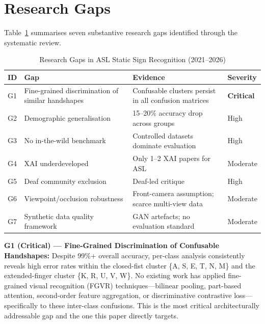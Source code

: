\documentclass[conference]{IEEEtran}
\begin{document}
\section{Research Gaps}
\label{sec:gaps}

Table~\ref{tab:gaps} summarises seven substantive research gaps identified
through the systematic review.

\begin{table}[htbp]
\caption{Research Gaps in ASL Static Sign Recognition (2021--2026)}
\label{tab:gaps}
\centering
\renewcommand{\arraystretch}{1.15}
\begin{tabular}{p{0.28cm} p{3.4cm} p{1.9cm} p{1.0cm}}
\toprule
\textbf{ID} & \textbf{Gap} & \textbf{Evidence} & \textbf{Severity} \\
\midrule
G1 & Fine-grained discrimination of similar handshapes
   & Confusable clusters persist in all confusion matrices & \textbf{Critical} \\
G2 & Demographic generalisation
   & 15--20\% accuracy drop across groups~\cite{alam2024} & High \\
G3 & No in-the-wild benchmark
   & Controlled datasets dominate evaluation & High \\
G4 & XAI underdeveloped
   & Only 1--2 XAI papers for ASL~\cite{naz2025} & Moderate \\
G5 & Deaf community exclusion
   & Deaf-led critique~\cite{yin2024} & High \\
G6 & Viewpoint/occlusion robustness
   & Front-camera assumption; scarce multi-view data & Moderate \\
G7 & Synthetic data quality framework
   & GAN artefacts; no evaluation standard & Moderate \\
\bottomrule
\end{tabular}
\end{table}

\textbf{G1 (Critical) --- Fine-Grained Discrimination of Confusable Handshapes:}
Despite 99\%+ overall accuracy, per-class analysis consistently reveals high
error rates within the closed-fist cluster \{A, S, E, T, N, M\} and the
extended-finger cluster \{K, R, U, V, W\}. No existing work has applied
fine-grained visual recognition (FGVR) techniques---bilinear pooling, part-based
attention, second-order feature aggregation, or discriminative contrastive
loss---specifically to these inter-class confusions. This is the most critical
architecturally addressable gap and the one this paper directly targets.
\end{document}
